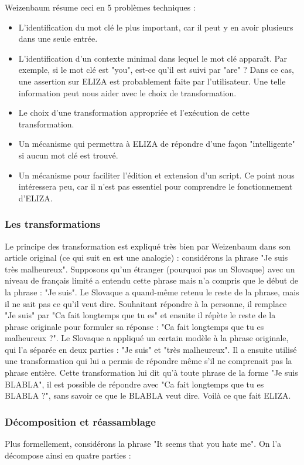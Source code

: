 \documentclass[11pt, a4paper]{report}
\begin{document}
Weizenbaum résume ceci en 5 problèmes techniques :
\begin{itemize}
  \item L'identification du mot clé le plus important, car il peut y en avoir plusieurs dans une 
  seule entrée.
  \item L'identification d'un contexte minimal dans lequel le mot clé apparaît. Par exemple, si le 
  mot clé est "you", est-ce qu'il est suivi par "are" ? Dans ce cas, une assertion sur ELIZA est 
  probablement faite par l'utilisateur. Une telle information peut nous aider avec le choix de transformation.
  \item Le choix d'une transformation appropriée et l'exécution de cette transformation. 
  \item Un mécanisme qui permettra à ELIZA de répondre d'une façon "intelligente" si aucun mot 
  clé est trouvé. 
  \item Un mécanisme pour faciliter l'édition et extension d'un script. Ce point nous intéressera peu, 
  car il n'est pas essentiel pour comprendre le fonctionnement d'ELIZA. 
\end{itemize}

      \subsubsection{Les transformations}
Le principe des transformation est expliqué très bien par Weizenbaum dans son article original (ce qui suit 
en est une analogie) : 
considérons la phrase "Je suis très malheureux". Supposons qu'un étranger (pourquoi pas un Slovaque) avec un niveau de 
français limité a entendu cette phrase mais n'a compris que le début de la phrase : "Je suis". 
Le Slovaque a quand-même retenu le reste de la phrase, mais il ne sait pas ce qu'il veut dire. 
Souhaitant répondre à la personne, il remplace "Je suis" par "Ca fait longtemps que tu es"
et ensuite il répète le reste de la phrase originale pour formuler sa réponse :
"Ca fait longtemps que tu es malheureux ?". Le Slovaque a appliqué un certain modèle
à la phrase originale, qui l'a séparée en deux parties : "Je suis" et "très malheureux".
Il a ensuite utilisé une transformation qui lui a permis de répondre même s'il ne comprenait pas 
la phrase entière. Cette transformation lui dit qu'à toute phrase de la forme 
"Je suis BLABLA", il est possible de répondre avec "Ca fait longtemps que tu es BLABLA ?", 
sans savoir ce que le BLABLA veut dire. Voilà ce que fait ELIZA.  

      \subsubsection{Décomposition et réassamblage}
Plus formellement, considérons la phrase "It seems that you hate me". On l'a décompose ainsi
en quatre parties :
\end{document}
